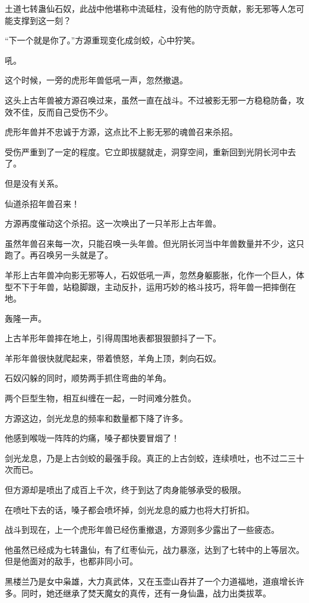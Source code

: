 \begin{this_body}
土道七转蛊仙石奴，此战中他堪称中流砥柱，没有他的防守贡献，影无邪等人怎可能支撑到这一刻？

“下一个就是你了。”方源重现变化成剑蛟，心中狞笑。

吼。

这个时候，一旁的虎形年兽低吼一声，忽然撤退。

这头上古年兽被方源召唤过来，虽然一直在战斗。不过被影无邪一方稳稳防备，攻效不佳，反而自己受伤不少。

虎形年兽并不忠诚于方源，这点比不上影无邪的魂兽召来杀招。

受伤严重到了一定的程度。它立即拔腿就走，洞穿空间，重新回到光阴长河中去了。

但是没有关系。

仙道杀招年兽召来！

方源再度催动这个杀招。这一次唤出了一只羊形上古年兽。

虽然年兽召来每一次，只能召唤一头年兽。但光阴长河当中年兽数量并不少，这只跑了。再召唤另一头就是了。

羊形上古年兽冲向影无邪等人，石奴低吼一声，忽然身躯膨胀，化作一个巨人，体型不下于年兽，站稳脚跟，主动反扑，运用巧妙的格斗技巧，将年兽一把摔倒在地。

轰隆一声。

上古羊形年兽摔在地上，引得周围地表都狠狠颤抖了一下。

羊形年兽很快就爬起来，带着愤怒，羊角上顶，刺向石奴。

石奴闪躲的同时，顺势两手抓住弯曲的羊角。

两个巨型生物，相互纠缠在一起，一时间难分胜负。

方源这边，剑光龙息的频率和数量都下降了许多。

他感到喉咙一阵阵的灼痛，嗓子都快要冒烟了！

剑光龙息，乃是上古剑蛟的最强手段。真正的上古剑蛟，连续喷吐，也不过二三十次而已。

但方源却是喷出了成百上千次，终于到达了肉身能够承受的极限。

在喷吐下去的话，嗓子都会喷坏掉，剑光龙息的威力也将大打折扣。

战斗到现在，上一个虎形年兽已经伤重撤退，方源则多少露出了一些疲态。

他虽然已经成为七转蛊仙，有了红枣仙元，战力暴涨，达到了七转中的上等层次。但是他面对的敌手，也都非同小可。

黑楼兰乃是女中枭雄，大力真武体，又在玉壶山吞并了一个力道福地，道痕增长许多。同时，她还继承了焚天魔女的真传，还有一身仙蛊，战力出类拔萃。


\end{this_body}
